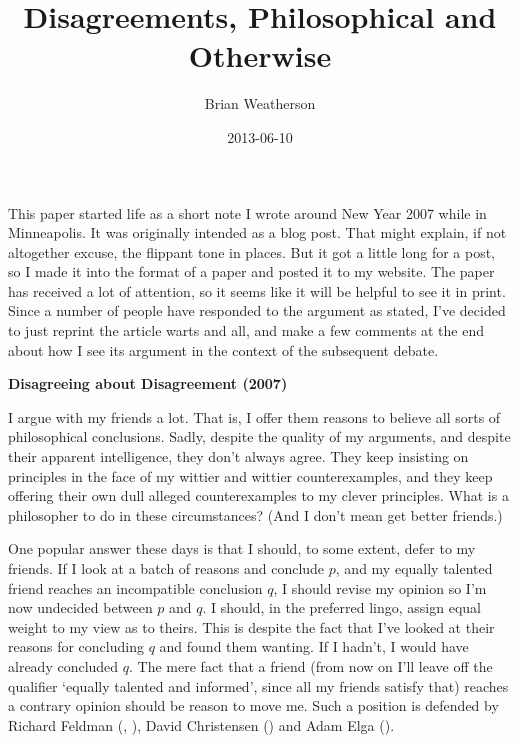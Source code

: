\documentclass[
  11pt,
  letterpaper,
  DIV=11,
  numbers=noendperiod,
  oneside]{scrartcl}
\title{Disagreements, Philosophical and Otherwise}
\author{Brian Weatherson}
\date{2013-06-10}
\begin{document}
\maketitle
This paper started life as a short note I wrote around New Year 2007
while in Minneapolis. It was originally intended as a blog post. That
might explain, if not altogether excuse, the flippant tone in places.
But it got a little long for a post, so I made it into the format of a
paper and posted it to my website. The paper has received a lot of
attention, so it seems like it will be helpful to see it in print. Since
a number of people have responded to the argument as stated, I've
decided to just reprint the article warts and all, and make a few
comments at the end about how I see its argument in the context of the
subsequent debate.

\textbf{Disagreeing about Disagreement (2007)}

I argue with my friends a lot. That is, I offer them reasons to believe
all sorts of philosophical conclusions. Sadly, despite the quality of my
arguments, and despite their apparent intelligence, they don't always
agree. They keep insisting on principles in the face of my wittier and
wittier counterexamples, and they keep offering their own dull alleged
counterexamples to my clever principles. What is a philosopher to do in
these circumstances? (And I don't mean get better friends.)

One popular answer these days is that I should, to some extent, defer to
my friends. If I look at a batch of reasons and conclude \(p\), and my
equally talented friend reaches an incompatible conclusion \(q\), I
should revise my opinion so I'm now undecided between \(p\) and \(q\). I
should, in the preferred lingo, assign equal weight to my view as to
theirs. This is despite the fact that I've looked at their reasons for
concluding \(q\) and found them wanting. If I hadn't, I would have
already concluded \(q\). The mere fact that a friend (from now on I'll
leave off the qualifier `equally talented and informed', since all my
friends satisfy that) reaches a contrary opinion should be reason to
move me. Such a position is defended by Richard Feldman
(,
), David Christensen
() and Adam Elga
().
\end{document}
